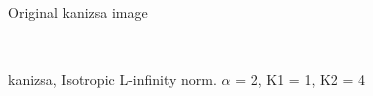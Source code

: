 \begin{figure}
  \centering
     \\
  \caption{Original kanizsa image}
  \label{fig:kanizsa}
\end{figure}

\begin{figure}
  \centering
     \\
  \caption{kanizsa, Isotropic L-infinity norm. $\alpha$ = 2, K1 = 1, K2 = 4}
  \label{fig:kanizsa_LINF_a2_k11_k24}
\end{figure}

